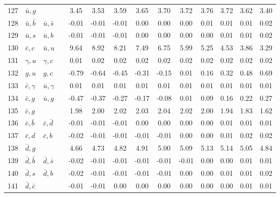 \begin{tabularx}{\textwidth}{rXXX@{}S@{}S@{}S@{}S@{}S@{}S@{}S@{}S@{}S@{}S}
127 & $\bar u, g$      &                   &                  &  3.45 &  3.53 &  3.59 &  3.65 &  3.70 &  3.72 &  3.76 &  3.72 &  3.62 &  3.40 \\
128 & $\bar u, \bar b$ & $\bar u, \bar s$  &                  & -0.01 & -0.01 & -0.01 &  0.00 &  0.00 &  0.00 &  0.01 &  0.01 &  0.01 &  0.02 \\
129 & $\bar u, s$      & $\bar u, b$       &                  & -0.01 & -0.01 & -0.01 &  0.00 &  0.00 &  0.00 &  0.00 &  0.01 &  0.01 &  0.02 \\
130 & $\bar c, c$      & $\bar u, u$       &                  &  9.64 &  8.92 &  8.21 &  7.49 &  6.75 &  5.99 &  5.25 &  4.53 &  3.86 &  3.29 \\
131 & $\gamma, u$      & $\gamma, c$       &                  &  0.01 &  0.02 &  0.02 &  0.02 &  0.02 &  0.02 &  0.02 &  0.02 &  0.02 &  0.02 \\
132 & $g, u$           & $g,  c$           &                  & -0.79 & -0.64 & -0.45 & -0.31 & -0.15 &  0.01 &  0.16 &  0.32 &  0.48 &  0.69 \\
133 & $\bar c, \gamma$ & $\bar u, \gamma$  &                  &  0.01 &  0.01 &  0.01 &  0.01 &  0.01 &  0.01 &  0.01 &  0.01 &  0.01 &  0.01 \\
134 & $\bar c, g$      & $\bar u, g$       &                  & -0.47 & -0.37 & -0.27 & -0.17 & -0.08 &  0.01 &  0.09 &  0.16 &  0.22 &  0.27 \\
135 & $\bar c, g$      &                   &                  &  1.98 &  2.00 &  2.02 &  2.03 &  2.04 &  2.02 &  2.00 &  1.94 &  1.83 &  1.62 \\
136 & $\bar c, \bar b$ & $\bar c, \bar d$  &                  & -0.01 & -0.01 & -0.01 &  0.00 &  0.00 &  0.00 &  0.00 &  0.01 &  0.01 &  0.01 \\
137 & $\bar c, d$      & $\bar c, b$       &                  & -0.02 & -0.01 & -0.01 & -0.01 & -0.01 &  0.00 &  0.00 &  0.01 &  0.02 &  0.02 \\
138 & $\bar d, g$      &                   &                  &  4.66 &  4.73 &  4.82 &  4.91 &  5.00 &  5.09 &  5.13 &  5.14 &  5.05 &  4.84 \\
139 & $\bar d, \bar b$ & $\bar d, \bar s$  &                  & -0.02 & -0.01 & -0.01 & -0.01 & -0.01 & -0.01 &  0.00 &  0.00 &  0.01 &  0.01 \\
140 & $\bar d, s$      & $\bar d, b$       &                  & -0.02 & -0.01 & -0.01 & -0.01 & -0.01 &  0.00 &  0.00 &  0.01 &  0.01 &  0.02 \\
141 & $\bar d, \bar c$ &                   &                  & -0.01 & -0.01 &  0.00 &  0.00 &  0.00 &  0.00 &  0.00 &  0.00 &  0.01 &  0.01 \\

\end{tabularx}
